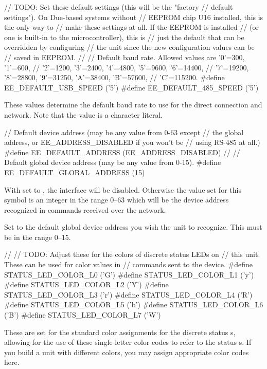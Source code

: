 \begin{SourceCode}
// TODO: Set these default settings (this will be the "factory
//	 default settings"). On Due-based systems without 
//       EEPROM chip U16 installed, this is the only way to 
//       make these settings at all. If the EEPROM is installed
//       (or one is built-in to the microcontroller), this is
//       just the default that can be overridden by configuring
//       the unit since the new configuration values can be
//       saved in EEPROM.
//
// Default baud rate. Allowed values are '0'=300, '1'=600, 
// '2'=1200, '3'=2400, '4'=4800, '5'=9600, '6'=14400,
// '7'=19200, '8'=28800, '9'=31250, 'A'=38400, 'B'=57600,
// 'C'=115200.
#define EE_DEFAULT_USB_SPEED  ('5')
#define EE_DEFAULT_485_SPEED ('5')
\end{SourceCode}
These values determine the default baud rate to use for the  direct
connection and  network. Note that the value is a character literal.

\begin{SourceCode}
// Default device address (may be any value from 0-63 except
// the global address, or EE_ADDRESS_DISABLED if you won't be 
// using RS-485 at all.)
#define EE_DEFAULT_ADDRESS (EE_ADDRESS_DISABLED)
//
// Default global device address (may be any value from 0-15).
#define EE_DEFAULT_GLOBAL_ADDRESS (15)
\end{SourceCode}
With  set to ,
the  interface will be disabled. Otherwise the value
set for this symbol is an integer in the range 0--63 which will be
the device address recognized in commands received over the
 network.

Set  to the default global device address you
wish the unit to recognize. This must be in the range 0--15.

\begin{SourceCode}
//
// TODO: Adjust these for the colors of discrete status LEDs on
//       this unit. These can be used for color values in
//       commands sent to the device.
#define STATUS_LED_COLOR_L0 ('G')
#define STATUS_LED_COLOR_L1 ('y')
#define STATUS_LED_COLOR_L2 ('Y')
#define STATUS_LED_COLOR_L3 ('r')
#define STATUS_LED_COLOR_L4 ('R')
#define STATUS_LED_COLOR_L5 ('b')
#define STATUS_LED_COLOR_L6 ('B')
#define STATUS_LED_COLOR_L7 ('W')
\end{SourceCode}
These are set for the standard color assignments for the discrete status \led s, allowing for
the use of these single-letter color codes to refer to the status \led s. If you build a
unit with different colors, you may assign appropriate color codes here.


